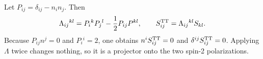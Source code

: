 \begin{enumerate}[leftmargin=2.8em,itemsep=1.2em]
Let \(P_{ij}=\delta_{ij}-n_in_j\).  Then
\[
 \Lambda_{ij}{}^{kl}=P_i{}^kP_j{}^l-\frac12P_{ij}P^{kl},
 \qquad S^{\rm TT}_{ij}=\Lambda_{ij}{}^{kl}S_{kl}.
\]
Because \(P_{ij}n^j=0\) and \(P_i{}^i=2\), one obtains
\(n^iS^{\rm TT}_{ij}=0\) and \(\delta^{ij}S^{\rm TT}_{ij}=0\).  Applying
\(\Lambda\) twice changes nothing, so it is a projector onto the two
spin-2 polarizations.
\end{enumerate}
